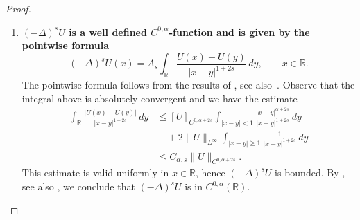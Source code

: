 \documentclass[a4paper,11pt,reqno]{amsart}
\newcommand{\R}{\mathbb{R}}
\theoremstyle{definition}
\numberwithin{equation}{section}
\begin{document}
\begin{proof}
\begin{enumerate}[$(1)$]
\begin{align*}
+\int_{|x_1-y|<2|x_1-x_2|}\frac{|F(y)-F(x_1)|}{|x_2-y|^{1-2s}}\,dy \\
&\leq [F]_{C^{0,\alpha}}\int_{|x_1-y|<2|x_1-x_2|}\frac{|y-x_1|^\alpha}{|x_1-y|^{1-2s}}\,dy \\
&\quad+C_\alpha[F]_{C^{0,\alpha}}\int_{|x_2-y|<4|x_1-x_2|}\frac{(|y-x_2|^\alpha+|x_2-x_1|^\alpha)}{|x_2-y|^{1-2s}}\,dy \\
&= C_{\alpha,s}[F]_{C^{0,\alpha}}|x_1-x_2|^{\alpha+2s}.
\end{align*}
To estimate the second integral, suppose that $|x_1-y|\geq 2|x_1-x_2|$. Let $\xi$ be an intermediate
point between $x_1$ and $x_2$. Then $|x_1-y|\leq|x_1-\xi|+|\xi-y|\leq|x_1-x_2|+|\xi-y|\leq
\frac{1}{2}|x_1-y|+|\xi-y|$. As a consequence, $|x_1-y|<2|\xi-y|$ and so
$|\xi-y|^{-2+2s}\leq C_s|x_1-y|^{-2+2s}$.
Using this, the Mean Value Theorem and the fact that $\alpha+2s<1$, we can estimate
\begin{align*}
II &\leq [F]_{C^{0,\alpha}}\int_{|x_1-y|\geq2|x_1-x_2|}|y-x_1|^\alpha
\big||x_1-y|^{-1+2s}-|x_2-y|^{-1+2s}\big|\,dy \\
&\leq C_s[F]_{C^{0,\alpha}}|x_1-x_2|\int_{|x_1-y|\geq2|x_1-x_2|}|y-x_1|^\alpha|x_1-y|^{-2+2s}\,dy \\
&=C_{\alpha,s}[F]_{C^{0,\alpha}}|x_1-x_2|^{\alpha+2s}.
\end{align*}
These estimates for $I$ and $II$, together with \eqref{laprimera} and \eqref{lasegunda},
imply~\eqref{eq:laregularidaddeU}.

\item \textbf{$(-\Delta)^sU$ is a well defined $C^{0,\alpha}$-function
and is given by the pointwise formula}
$$
(-\Delta)^sU(x)=A_s\int_{\R}\frac{U(x)-U(y)}{|x-y|^{1+2s}}\,dy,\qquad x\in\R.
$$
The pointwise formula follows from the results of \cite[p.~73]{Silvestre-CPAM}, see also~\cite{Stinga}.
Observe that the integral above is absolutely convergent and we have the estimate
\begin{equation}
\label{eq:acotacion}
\begin{aligned}
\int_{\R}\frac{|U(x)-U(y)|}{|x-y|^{1+2s}}\,dy&\leq [U]_{C^{0,\alpha+2s}}\int_{|x-y|<1}\frac{|x-y|^{\alpha+2s}}{|x-y|^{1+2s}}\,dy \\
&\quad+2\|U\|_{L^\infty}\int_{|x-y|\geq1}\frac{1}{|x-y|^{1+2s}}\,dy \\
&\leq C_{\alpha,s}\|U\|_{C^{0,\alpha+2s}}.
\end{aligned}
\end{equation}
This estimate is valid uniformly in $x\in\R$, hence $(-\Delta)^sU$ is bounded.
By \cite[p.~74]{Silvestre-CPAM}, see also \cite{Stinga}, we conclude that $(-\Delta)^sU$ is in $C^{0,\alpha}(\R)$.


\end{enumerate}
\end{proof}
\end{document}
